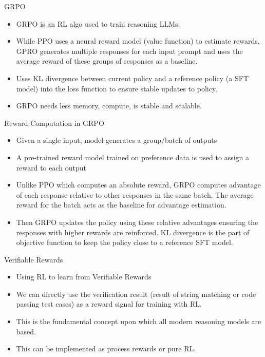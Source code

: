 \begin{frame}[fragile]{GRPO}


    \begin{itemize}
        \item   GRPO is an RL algo used to train reasoning LLMs. 
        \item   While PPO uses a neural reward model (value function) to estimate 
rewards, GPRO generates multiple responses for each input prompt and 
uses the average reward of these groups of responses as a baseline.  
        \item   Uses KL divergence between current policy and a reference policy (a 
SFT model) into the loss function to ensure stable updates to policy.
        \item   GRPO needs less memory, compute, is stable and scalable. 
    \end{itemize}
\end{frame}


\begin{frame}[fragile]{Reward Computation in GRPO}


    \begin{itemize}
        \item    Given a single input, model generates a group/batch of outputs
        \item    A pre-trained reward model trained on preference data is used to assign a 
reward to each output
        \item    Unlike PPO which computes an absolute reward, GRPO computes 
advantage of each response relative to other responses in the same batch. 
The average reward for the batch acts as the baseline for advantage estimation.
        \item     Then GRPO updates the policy using these relative advantages ensuring the 
responses with higher rewards are reinforced. KL divergence is the part of 
objective function to keep the policy close to a reference SFT model. 
    \end{itemize}
\end{frame}

\begin{frame}[fragile]{Verifiable Rewards}


    \begin{itemize}
        \item   Using RL to learn from Verifiable Rewards
        \item    We can directly use the verification result (result of string matching 
or code passing test cases) as a reward signal for training with RL. 
        \item   This is the fundamental concept upon which all modern reasoning 
models are based.
        \item    This can be implemented as process rewards or pure RL. 
    \end{itemize}
\end{frame}

